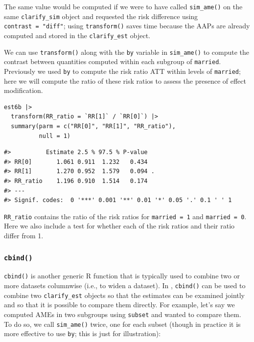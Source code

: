 The same value would be computed if we were to have called \texttt{sim\_ame()} on the same \texttt{clarify\_sim} object and requested the risk difference using \texttt{contrast\ =\ "diff"}; using \texttt{transform()} saves time because the AAPs are already computed and stored in the \texttt{clarify\_est} object.

We can use \texttt{transform()} along with the \texttt{by} variable in \texttt{sim\_ame()} to compute the contrast between quantities computed within each subgroup of \texttt{married}. Previously we used \texttt{by} to compute the risk ratio ATT within levels of \texttt{married}; here we will compute the ratio of these risk ratios to assess the presence of effect modification.

\begin{verbatim}
est6b |>
  transform(RR_ratio = `RR[1]` / `RR[0]`) |>
  summary(parm = c("RR[0]", "RR[1]", "RR_ratio"),
          null = 1)
\end{verbatim}

\begin{verbatim}
#>          Estimate 2.5 % 97.5 % P-value  
#> RR[0]       1.061 0.911  1.232   0.434  
#> RR[1]       1.270 0.952  1.579   0.094 .
#> RR_ratio    1.196 0.910  1.514   0.174  
#> ---
#> Signif. codes:  0 '***' 0.001 '**' 0.01 '*' 0.05 '.' 0.1 ' ' 1
\end{verbatim}

\texttt{RR\_ratio} contains the ratio of the risk ratios for \texttt{married\ =\ 1} and \texttt{married\ =\ 0}. Here we also include a test for whether each of the risk ratios and their ratio differ from 1.

\hypertarget{cbind}{%
\subsubsection{\texorpdfstring{\texttt{cbind()}}{cbind()}}\label{cbind}}

\texttt{cbind()} is another generic R function that is typically used to combine two or more datasets columnwise (i.e., to widen a dataset). In , \texttt{cbind()} can be used to combine two \texttt{clarify\_est} objects so that the estimates can be examined jointly and so that it is possible to compare them directly. For example, let's say we computed AMEs in two subgroups using \texttt{subset} and wanted to compare them. To do so, we call \texttt{sim\_ame()} twice, one for each subset (though in practice it is more effective to use \texttt{by}; this is just for illustration):

